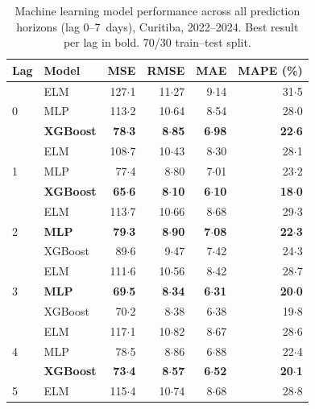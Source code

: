 \documentclass[12pt]{article}
\begin{document}
\begin{table}[ht]
\centering
\caption{Machine learning model performance across all prediction
horizons (lag 0--7~days), Curitiba, 2022--2024. Best result per lag
in bold. 70/30 train--test split.}
\label{etab:ml_full_results}
\begin{tabular}{llrrrr}
\toprule
Lag & Model & MSE & RMSE & MAE & MAPE (\%) \\
\midrule
\multirow{3}{*}{0}
  & ELM     & 127${\cdot}$1 & 11${\cdot}$27 & 9${\cdot}$14 & 31${\cdot}$5 \\
  & MLP     & 113${\cdot}$2 & 10${\cdot}$64 & 8${\cdot}$54 & 28${\cdot}$0 \\
  & \textbf{XGBoost} & \textbf{78${\cdot}$3} & \textbf{8${\cdot}$85} & \textbf{6${\cdot}$98} & \textbf{22${\cdot}$6} \\
\midrule
\multirow{3}{*}{1}
  & ELM     & 108${\cdot}$7 & 10${\cdot}$43 & 8${\cdot}$30 & 28${\cdot}$1 \\
  & MLP     &  77${\cdot}$4 &  8${\cdot}$80 & 7${\cdot}$01 & 23${\cdot}$2 \\
  & \textbf{XGBoost} & \textbf{65${\cdot}$6} & \textbf{8${\cdot}$10} & \textbf{6${\cdot}$10} & \textbf{18${\cdot}$0} \\
\midrule
\multirow{3}{*}{2}
  & ELM     & 113${\cdot}$7 & 10${\cdot}$66 & 8${\cdot}$68 & 29${\cdot}$3 \\
  & \textbf{MLP} & \textbf{79${\cdot}$3} & \textbf{8${\cdot}$90} & \textbf{7${\cdot}$08} & \textbf{22${\cdot}$3} \\
  & XGBoost &  89${\cdot}$6 &  9${\cdot}$47 & 7${\cdot}$42 & 24${\cdot}$3 \\
\midrule
\multirow{3}{*}{3}
  & ELM     & 111${\cdot}$6 & 10${\cdot}$56 & 8${\cdot}$42 & 28${\cdot}$7 \\
  & \textbf{MLP} & \textbf{69${\cdot}$5} & \textbf{8${\cdot}$34} & \textbf{6${\cdot}$31} & \textbf{20${\cdot}$0} \\
  & XGBoost &  70${\cdot}$2 &  8${\cdot}$38 & 6${\cdot}$38 & 19${\cdot}$8 \\
\midrule
\multirow{3}{*}{4}
  & ELM     & 117${\cdot}$1 & 10${\cdot}$82 & 8${\cdot}$67 & 28${\cdot}$6 \\
  & MLP     &  78${\cdot}$5 &  8${\cdot}$86 & 6${\cdot}$88 & 22${\cdot}$4 \\
  & \textbf{XGBoost} & \textbf{73${\cdot}$4} & \textbf{8${\cdot}$57} & \textbf{6${\cdot}$52} & \textbf{20${\cdot}$1} \\
\midrule
\multirow{3}{*}{5}
  & ELM     & 115${\cdot}$4 & 10${\cdot}$74 & 8${\cdot}$68 & 28${\cdot}$8 \\

\end{tabular}
\end{table}
\end{document}
